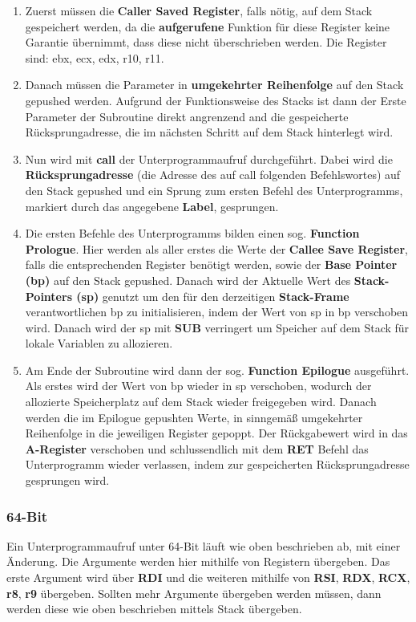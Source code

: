 \documentclass[12pt]{article}
\begin{document}
\begin{enumerate}
\item Zuerst müssen die \textbf{Caller Saved Register}, falls nötig, auf dem Stack gespeichert werden, da die \textbf{aufgerufene} Funktion für diese Register keine Garantie übernimmt, dass diese nicht überschrieben werden. Die Register sind: ebx, ecx, edx, r10, r11.

\item Danach müssen die Parameter in \textbf{umgekehrter Reihenfolge} auf den Stack gepushed werden. Aufgrund der Funktionsweise des Stacks ist dann der Erste Parameter der Subroutine direkt angrenzend and die gespeicherte Rücksprungadresse, die im nächsten Schritt auf dem Stack hinterlegt wird.

\item Nun wird mit \textbf{call} der Unterprogrammaufruf durchgeführt. Dabei wird die \textbf{Rücksprungadresse} (die Adresse des auf call folgenden Befehlswortes) auf den Stack gepushed und ein Sprung zum ersten Befehl des Unterprogramms, markiert durch das angegebene \textbf{Label}, gesprungen.

\item Die ersten Befehle des Unterprogramms bilden einen sog. \textbf{Function Prologue}. Hier werden als aller erstes die Werte der \textbf{Callee Save Register}, falls die entsprechenden Register benötigt werden, sowie der \textbf{Base Pointer (bp)} auf den Stack gepushed. Danach wird der Aktuelle Wert des \textbf{Stack-Pointers (sp)} genutzt um den für den derzeitigen \textbf{Stack-Frame} verantwortlichen bp zu initialisieren, indem der Wert von sp in bp verschoben wird. Danach wird der sp mit \textbf{SUB} verringert um Speicher auf dem Stack für lokale Variablen zu allozieren.

\item Am Ende der Subroutine wird dann der sog. \textbf{Function Epilogue} ausgeführt. Als erstes wird der Wert von bp wieder in sp verschoben, wodurch der allozierte Speicherplatz auf dem Stack wieder freigegeben wird. Danach werden die im Epilogue gepushten Werte, in sinngemäß umgekehrter Reihenfolge in die jeweiligen Register gepoppt. Der Rückgabewert wird in das \textbf{A-Register} verschoben und schlussendlich mit dem \textbf{RET} Befehl das Unterprogramm wieder verlassen, indem zur gespeicherten Rücksprungadresse gesprungen wird.  
\end{enumerate}

\newpage
\subsubsection*{64-Bit}
Ein Unterprogrammaufruf unter 64-Bit läuft wie oben beschrieben ab, mit einer Änderung. Die Argumente werden hier mithilfe von Registern übergeben. Das erste Argument wird über \textbf{RDI} und die weiteren mithilfe von \textbf{RSI}, \textbf{RDX}, \textbf{RCX}, \textbf{r8}, \textbf{r9} übergeben. Sollten mehr Argumente übergeben werden müssen, dann werden diese wie oben beschrieben mittels Stack übergeben.
\end{document}
